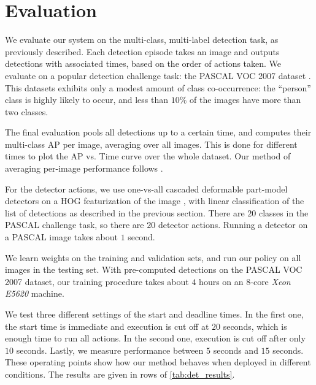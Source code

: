 \section{Evaluation}\label{sec:det_evaluation}

We evaluate our system on the multi-class, multi-label detection task, as previously described.
Each detection episode takes an image and outputs detections with associated times, based on the order of actions taken.
We evaluate on a popular detection challenge task: the PASCAL VOC 2007 dataset \parencite{pascal-voc-2010}.
This datasets exhibits only a modest amount of class co-occurrence: the ``person'' class is highly likely to occur, and less than $10\%$ of the images have more than two classes.

The final evaluation pools all detections up to a certain time, and computes their multi-class AP per image, averaging over all images.
This is done for different times to plot the AP vs. Time curve over the whole dataset.
Our method of averaging per-image performance follows \parencite{Desai2009}.

For the detector actions, we use one-vs-all cascaded deformable part-model detectors on a HOG featurization of the image \parencite{Felzenszwalb-CVPR-2010}, with linear classification of the list of detections as described in the previous section.
There are $20$ classes in the PASCAL challenge task, so there are $20$ detector actions.
Running a detector on a PASCAL image takes about $1$ second.

We learn weights on the training and validation sets, and run our policy on all images in the testing set.
With pre-computed detections on the PASCAL VOC 2007 dataset, our training procedure takes about $4$ hours on an $8$-core \emph{Xeon E5620} machine.

We test three different settings of the start and deadline times.
In the first one, the start time is immediate and execution is cut off at $20$ seconds, which is enough time to run all actions.
In the second one, execution is cut off after only $10$ seconds.
Lastly, we measure performance between $5$ seconds and $15$ seconds.
These operating points show how our method behaves when deployed in different conditions.
The results are given in rows of \autoref{tab:det_results}.



